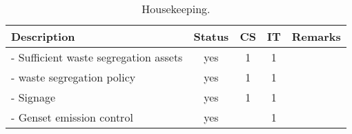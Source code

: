 \begin{table}
	\caption{Housekeeping.}
	\label{ch047_tbl_housekeeping}
	{\footnotesize


\begin{tabular}{l|c|c|c|l}
\hline
Description & Status & CS & IT & Remarks \\ 
\hline
- Sufficient waste segregation assets & yes & 1 & 1 &  \\ 
- waste segregation policy & yes & 1 & 1 &  \\ 
- Signage & yes & 1 & 1 &  \\ 
- Genset emission control & yes &  & 1 &  \\ 
\hline
\end{tabular}

	}
\end{table}